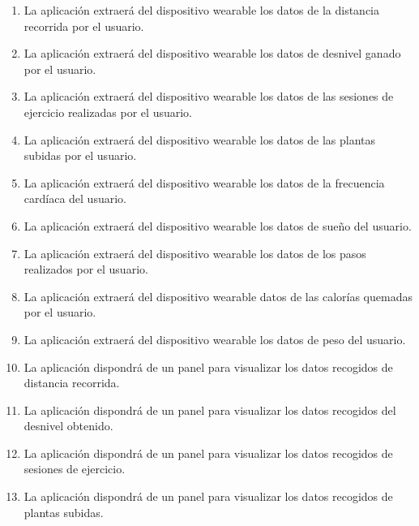 \begin{enumerate}[resume=req-usuario,label=\textbf{\texttt{RU-\arabic*}}]
\begin{enumerate}[resume=req-funcionales,label=\textbf{\texttt{RF-\arabic*}}]
                \item \label{req:funcionales:extraer_distancia} La aplicación extraerá del dispositivo \gls{wearable} los datos de la distancia recorrida por el usuario.
                \item \label{req:funcionales:extraer_desnivel} La aplicación extraerá del dispositivo \gls{wearable} los datos de desnivel ganado por el usuario.
                \item \label{req:funcionales:extraer_ejercicio} La aplicación extraerá del dispositivo \gls{wearable} los datos de las sesiones de ejercicio realizadas por el usuario.
                \item \label{req:funcionales:extraer_plantas} La aplicación extraerá del dispositivo \gls{wearable} los datos de las plantas subidas por el usuario.
                \item \label{req:funcionales:extraer_pulsaciones} La aplicación extraerá del dispositivo \gls{wearable} los datos de la frecuencia cardíaca del usuario.
                \item \label{req:funcionales:extraer_sueno} La aplicación extraerá del dispositivo \gls{wearable} los datos de sueño del usuario.
                \item \label{req:funcionales:extraer_pasos} La aplicación extraerá del dispositivo \gls{wearable} los datos de los pasos realizados por el usuario.
                \item \label{req:funcionales:extraer_calorias} La aplicación extraerá del dispositivo \gls{wearable} datos de las calorías quemadas por el usuario.
                \item \label{req:funcionales:extraer_peso} La aplicación extraerá del dispositivo \gls{wearable} los datos de peso del usuario.
                \item \label{req:funcionales:visualizar_distancia} La aplicación dispondrá de un panel para visualizar los datos recogidos de distancia recorrida.
                \item \label{req:funcionales:visualizar_desnivel} La aplicación dispondrá de un panel para visualizar los datos recogidos del desnivel obtenido.
                \item \label{req:funcionales:visualizar_ejercicio} La aplicación dispondrá de un panel para visualizar los datos recogidos de sesiones de ejercicio.
                \item \label{req:funcionales:visualizar_plantas} La aplicación dispondrá de un panel para visualizar los datos recogidos de plantas subidas.

\end{enumerate}
\end{enumerate}
